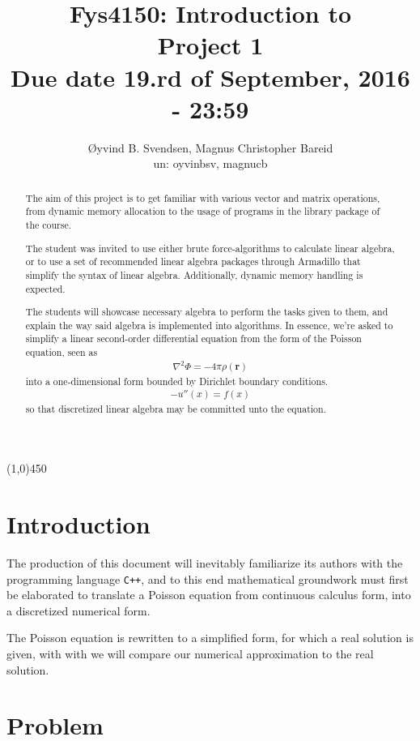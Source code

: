 \documentclass[11pt,a4paper,notitlepage]{article}
\title{\normalsize Fys4150: Introduction to \\
\vspace{10mm}
\huge Project 1\\
\vspace{10mm}
\normalsize Due date {\bf 19.rd of September, 2016 - 23:59}}
\author{Øyvind B. Svendsen, Magnus Christopher Bareid \\ un: oyvinbsv, magnucb}
\begin{document}
\noindent
\maketitle
\vspace{10mm}
\begin{abstract}
The aim of this project is to get familiar with various vector and matrix operations, from dynamic memory allocation to the usage of programs in the library package of the course.

The student was invited to use either brute force-algorithms to calculate linear algebra, or to use a set of recommended linear algebra packages through Armadillo that simplify the syntax of linear algebra. Additionally, dynamic memory handling is expected.

The students will showcase necessary algebra to perform the tasks given to them, and explain the way said algebra is implemented into algorithms. In essence, we're asked to simplify a linear second-order differential equation from the form of the Poisson equation, seen as
\begin{align*}
\nabla ^2 \Phi = -4\pi\rho(\mathbf{r})
\end{align*}
into a one-dimensional form bounded by Dirichlet boundary conditions.
\begin{align*}
-u''(x) = f(x)
\end{align*}
so that discretized linear algebra may be committed unto the equation.
\end{abstract}
\begin{center}
\line(1,0){450}
\end{center}

\newpage
\tableofcontents

\newpage
\section{Introduction}
The production of this document will inevitably familiarize its authors with the programming language \verb|C++|, and to this end mathematical groundwork must first be elaborated to translate a Poisson equation from continuous calculus form, into a discretized numerical form.

The Poisson equation is rewritten to a simplified form, for which a real solution is given, with with we will compare our numerical approximation to the real solution.

\section{Problem}
\end{document}
